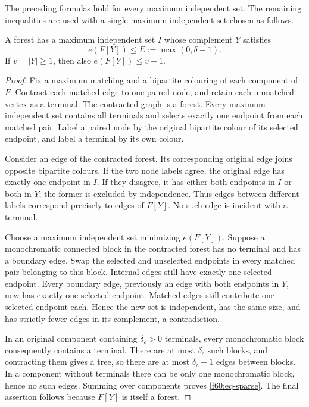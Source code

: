 The preceding formulas hold for every maximum independent set.  The
remaining inequalities are used with a single maximum independent set
chosen as follows.

\begin{lemma}
\label{f60:lem-sparse}
A forest has a maximum independent set $I$ whose complement $Y$ satisfies
\begin{equation}
 e(F[Y])\le E:=\max(0,\delta-1).
 \label{f60:eq-sparse}
\end{equation}
If $v=|Y|\ge1$, then also $e(F[Y])\le v-1$.
\end{lemma}

\begin{proof}
Fix a maximum matching and a bipartite colouring of each component of
$F$.  Contract each matched edge to one paired node, and retain each
unmatched vertex as a terminal.  The contracted graph is a forest.
Every maximum independent set contains all terminals and selects exactly
one endpoint from each matched pair.  Label a paired node by the original
bipartite colour of its selected endpoint, and label a terminal by its own
colour.

Consider an edge of the contracted forest.  Its corresponding original
edge joins opposite bipartite colours.  If the two node labels agree, the
original edge has exactly one endpoint in $I$.  If they disagree, it has
either both endpoints in $I$ or both in $Y$; the former is excluded by
independence.  Thus edges between different labels correspond precisely
to edges of $F[Y]$.  No such edge is incident with a terminal.

Choose a maximum independent set minimizing $e(F[Y])$.  Suppose a
monochromatic connected block in the contracted forest has no terminal
and has a boundary edge.  Swap the selected and unselected endpoints in
every matched pair belonging to this block.  Internal edges still have
exactly one selected endpoint.  Every boundary edge, previously an edge
with both endpoints in $Y$, now has exactly one selected endpoint.
Matched edges still contribute one selected endpoint each.  Hence the
new set is independent, has the same size, and has strictly fewer edges
in its complement, a contradiction.

In an original component containing $\delta_c>0$ terminals, every
monochromatic block consequently contains a terminal.  There are at most
$\delta_c$ such blocks, and contracting them gives a tree, so there are
at most $\delta_c-1$ edges between blocks.  In a component without
terminals there can be only one monochromatic block, hence no such
edges.  Summing over components proves
\eqref{f60:eq-sparse}.  The final assertion follows because $F[Y]$ is
itself a forest.
\end{proof}

